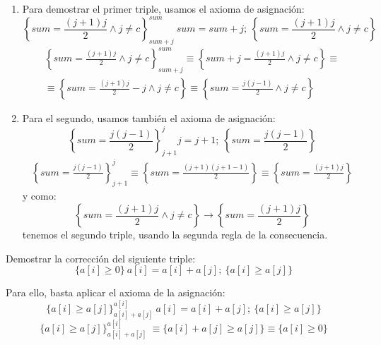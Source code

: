 \begin{ejercicio}
    \begin{enumerate}
        \item Para demostrar el primer triple, usamos el axioma de asignación:
            \begin{equation*}
                \left\{sum = \frac{(j+1)j}{2} \land j \neq c\right\}^{sum}_{sum+j}\ sum = sum + j;\ \left\{sum = \frac{(j+1)j}{2} \land j \neq c\right\} 
            \end{equation*}
            \begin{gather*}
                \left\{sum = \frac{(j+1)j}{2} \land j \neq c\right\}^{sum}_{sum+j} \equiv \left\{sum+j = \frac{(j+1)j}{2} \land j \neq c\right\} \equiv \\ 
                \equiv \left\{sum = \frac{(j+1)j}{2}-j \land j \neq c\right\} \equiv \left\{sum = \frac{j(j-1)}{2} \land j \neq c\right\}
            \end{gather*}
        \item Para el segundo, usamos también el axioma de asignación:
            \begin{equation*}
                \left\{sum = \frac{j(j-1)}{2}\right\}^j_{j+1} j=j+1;\ \left\{sum = \frac{j(j-1)}{2}\right\}
            \end{equation*}
            \begin{gather*}
                \left\{sum = \frac{j(j-1)}{2}\right\}^j_{j+1} \equiv \left\{sum = \frac{(j+1)(j+1-1)}{2}\right\} \equiv \left\{sum = \frac{(j+1)j}{2}\right\}
            \end{gather*}
            y como:
            \begin{equation*}
                \left\{sum = \frac{(j+1)j}{2} \land j \neq c\right\} \rightarrow \left\{sum = \frac{(j+1)j}{2}\right\}
            \end{equation*}
            tenemos el segundo triple, usando la segunda regla de la consecuencia.
    \end{enumerate}
\end{ejercicio}

\begin{ejercicio}
    Demostrar la corrección del siguiente triple:
    \begin{equation*}
        \{a[i]\geq 0\}\ a[i]=a[i]+a[j];\ \{a[i]\geq a[j]\}
    \end{equation*}

    Para ello, basta aplicar el axioma de la asignación:
    \begin{equation*}
        \{a[i]\geq a[j]\}_{a[i]+a[j]}^{a[i]}\ a[i]=a[i]+a[j];\ \{a[i]\geq a[j]\}
    \end{equation*}
    \begin{equation*}
        \{a[i]\geq a[j]\}_{a[i]+a[j]}^{a[i]}\ \equiv \{a[i]+a[j]\geq a[j]\} \equiv \{a[i] \geq 0\}
    \end{equation*}
\end{ejercicio}

